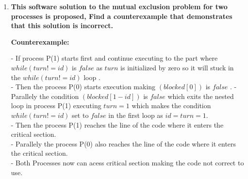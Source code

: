 \documentclass[a4paper,12pt,fleqn]{article}
\begin{document}
\begin{enumerate}
	\item \textbf {This software solution to the mutual exclusion problem for two processes is proposed, Find a counterexample that demonstrates that this solution is incorrect.}
\begin{answer}
	\textbf{Counterexample:}
	
	- If process P(1) starts first and continue executing to the part where $while (turn != id)$ is $false$ as $turn$ is initialized by zero so it will stuck in the $while (turn != id)$ loop .\\
	- Then the process P(0) starts execution making $ (blocked[0]) $ is $false$ .
	- Parallely the condition $ (blocked[1-id]) $ is $false$ which exits the nested loop in process P(1) executing $turn = 1 $ which makes the condition $while (turn != id)$ set to $false$ in the first loop as $id = turn = 1$.\\
	
	- Then the process P(1) reaches the line of the code where it enters the critical section. \\
	- Parallely the process P(0) also reaches the line of the code where it enters the critical section.\\
	- Both Processes now can acess critical section making the code not correct to use.
	
\end{answer}


\end{enumerate}
\end{document}
